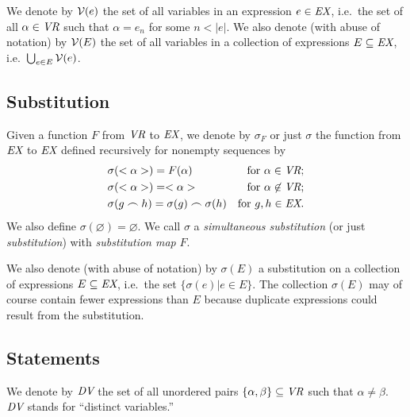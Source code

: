 We denote by ${\cal V}(e)$ the set of all variables in an expression $e \in
\mbox{\em EX}$, i.e.\ the set of all $\alpha \in \mbox{\em VR}$ such that
$\alpha = e_n$ for some $n < |e|$.  We also denote (with abuse of notation) by
${\cal V}(E)$ the set of all variables in a collection of expressions $E
\subseteq \mbox{\em EX}$, i.e.\ $\bigcup _{e \in E} {\cal V}(e)$.


\subsection{Substitution}

Given a function $F$ from $\mbox{\em VR}$ to
$\mbox{\em EX}$, we
denote by $\sigma_{F}$ or just $\sigma$ the function from $\mbox{\em EX}$ to
$\mbox{\em EX}$ defined recursively for nonempty sequences by
\begin{eqnarray*}
& \sigma(<\alpha>) = F(\alpha) & \mbox{for\ } \alpha \in \mbox{\em VR}; \\
& \sigma(<\alpha>) = <\alpha> & \mbox{for\ } \alpha \not\in \mbox{\em VR}; \\
& \sigma(g \frown h) = \sigma(g) \frown
    \sigma(h) & \mbox{for\ } g,h \in \mbox{\em EX}.
\end{eqnarray*}
We also define $\sigma(\varnothing)=\varnothing$.  We call $\sigma$ a {\em
simultaneous substitution} (or just {\em substitution}) with {\em substitution
map} $F$.

We also denote (with abuse of notation) by $\sigma(E)$ a substitution on a
collection of expressions $E \subseteq \mbox{\em EX}$, i.e.\ the set $\{
\sigma(e) | e \in E \}$.  The collection $\sigma(E)$ may of course contain
fewer expressions than $E$ because duplicate expressions could result from the
substitution.

\subsection{Statements}

We denote by $\mbox{\em DV}$ the set of all
unordered pairs $\{\alpha, \beta \} \subseteq \mbox{\em VR}$ such that $\alpha
\neq \beta$.  $\mbox{\em DV}$ stands for ``distinct variables.''

